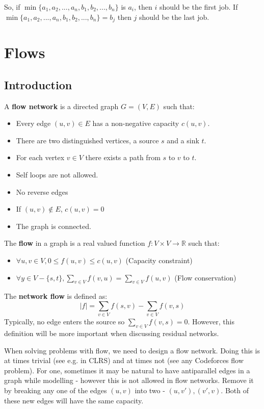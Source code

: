 \documentclass[12pt,letterpaper]{article}
\theoremstyle{definition}
\newcommand{\R}{\mathbb{R}}
\begin{document}
So, if $\min\{a_1,a_2,...,a_n,b_1,b_2,...,b_n\}$ is $a_i$, then $i$ should be the first job. If $\min\{a_1,a_2,...,a_n,b_1,b_2,...,b_n\} = b_j$ then $j$ should be the last job.

\section{Flows}

\subsection{Introduction}

A \textbf{flow network} is a directed graph $G = (V,E)$ such that:

\begin{itemize}
  \item Every edge $(u,v) \in E$ has a non-negative capacity $c(u,v)$.
  \item There are two distinguished vertices, a source $s$ and a sink $t$.
  \item For each vertex $v \in V$ there exists a path from $s$ to $v$ to $t$.
  \item Self loops are not allowed.
  \item No reverse edges
  \item If $(u,v) \notin E$, $c(u,v) = 0$
  \item The graph is connected.
\end{itemize}

The \textbf{flow} in a graph is a real valued function $f : V \times V \rightarrow \R$ such that:

\begin{itemize}
  \item $\forall u, v \in V, 0 \leq f(u,v) \leq c(u,v)$ (Capacity constraint)
  \item $\forall y \in V - \{s,t\}, \sum_{v \in V} f(v,u) = \sum_{v \in V} f(u,v)$ (Flow conservation)
\end{itemize}

The \textbf{network flow} is defined as:
\[|f| = \sum_{v \in V} f(s,v) - \sum_{v \in V} f(v,s)\]
Typically, no edge enters the source so $\sum_{v \in V} f(v,s) = 0$. However, this definition will be more important when discussing residual networks.

When solving problems with flow, we need to design a flow network. Doing this is at times trivial (see e.g. in CLRS) and at times not (see any Codeforces flow problem). For one, sometimes it may be natural to have antiparallel edges in a graph while modelling - however this is not allowed in flow networks. Remove it by  breaking any one of the edges $(u,v)$ into two - $(u,v'), (v',v)$. Both of these new edges will have the same capacity.
\end{document}
